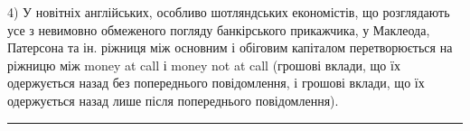 4) У новітніх англійських, особливо шотляндських економістів, що розглядають
усе з невимовно обмеженого погляду банкірського прикажчика,
у Маклеода, Патерсона та ін. ріжниця між основним і обіговим капіталом
перетворюється на ріжницю між money at call і money not at call
(грошові вклади, що їх одержується назад без попереднього повідомлення,
і грошові вклади, що їх одержується назад лише після попереднього
повідомлення).
\pfbreak

